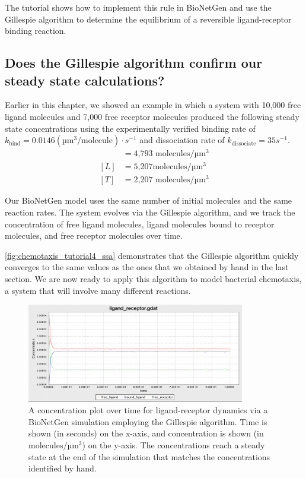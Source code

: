The tutorial  shows how to implement this rule in BioNetGen and use the Gillespie algorithm to determine the equilibrium of a reversible ligand-receptor binding reaction.


\FloatBarrier
{}
\subsection{Does the Gillespie algorithm confirm our steady state calculations?}

Earlier in this chapter, we showed an example in which a system with 10,000 free ligand molecules and 7,000 free receptor molecules produced the following steady state concentrations using the experimentally verified binding rate of $k_\text{bind} = 0.0146 (\text{µm}^3/\text{molecule}) \cdot s^{-1}$ and dissociation rate of $k_\text{dissociate} = 35s^{-1}$.
\begin{align*}
[LT] & = \text{4,793 molecules}/\text{µm}^3\\
[L] & = \text{5,207molecules}/\text{µm}^3\\
[T] & = \text{2,207 molecules}/\text{µm}^3
\end{align*}

Our BioNetGen model uses the same number of initial molecules and the same reaction rates. The system evolves via the Gillespie algorithm, and we track the concentration of free ligand molecules, ligand molecules bound to receptor molecules, and free receptor molecules over time.

\autoref{fig:chemotaxis_tutorial4_ssa} demonstrates that the Gillespie algorithm quickly converges to the same values as the ones that we obtained by hand in the last section. We are now ready to apply this algorithm to model bacterial chemotaxis, a system that will involve many different reactions.

\begin{figure}[h]
\centering
\mySfFamily
\includegraphics[width = 0.85\textwidth]{../images/chemotaxis_tutorial4_ssa.png}
\caption{A concentration plot over time for ligand-receptor dynamics via a BioNetGen simulation employing the Gillespie algorithm. Time is shown (in seconds) on the x-axis, and concentration is shown (in $\text{molecules}/\text{µm}^\text{3}$) on the y-axis. The concentrations reach a steady state at the end of the simulation that matches the concentrations identified by hand.}
\label{fig:chemotaxis_tutorial4_ssa}
\end{figure}

